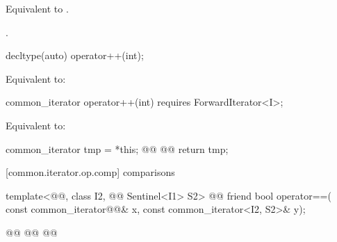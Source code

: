 \begin{addedblock}
\begin{itemdescr}
\pnum
\effects Equivalent to .

\pnum
\returns {}.
\end{itemdescr}

%
%
\begin{itemdecl}
decltype(auto) operator++(int);
\end{itemdecl}

\begin{itemdescr}
\pnum
\requires
{}

\pnum
\effects Equivalent to: 
\end{itemdescr}

\begin{itemdecl}
common_iterator operator++(int)
  requires ForwardIterator<I>;
\end{itemdecl}

\begin{itemdescr}
\pnum
\requires
{}

\pnum
\effects Equivalent to:
\begin{codeblock}
common_iterator tmp = *this;
@@
@@
return tmp;
\end{codeblock}
\end{itemdescr}

[common.iterator.op.comp]{ comparisons}

%
%
\begin{itemdecl}
template<@@, class I2, @@ Sentinel<I1> S2>
  @@
friend bool operator==(
  const common_iterator@@& x, const common_iterator<I2, S2>& y);
\end{itemdecl}

\begin{itemdescr}
\pnum
\newtxt{\requires
}

\pnum
{}
\begin{codeblock}
  @@
    @@
    @@
\end{codeblock}


\end{itemdescr}
\end{addedblock}
